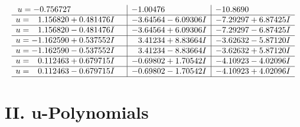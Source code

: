 \documentclass[1p]{elsarticle_modified}
\theoremstyle{definition}
\begin{document}
$$\begin{array}{c|c|c}
\begin{aligned}
u &= -0.756727\phantom{ +0.000000I}\end{aligned}
 & -1.00476\phantom{ +0.000000I} & -10.8690\phantom{ +0.000000I} \\ \hline\begin{aligned}
u &= \phantom{-}1.156820 + 0.481476 I\end{aligned}
 & -3.64564 - 6.09306 I & -7.29297 + 6.87425 I \\ \hline\begin{aligned}
u &= \phantom{-}1.156820 - 0.481476 I\end{aligned}
 & -3.64564 + 6.09306 I & -7.29297 - 6.87425 I \\ \hline\begin{aligned}
u &= -1.162590 + 0.537552 I\end{aligned}
 & \phantom{-}3.41234 + 8.83664 I & -3.62632 - 5.87120 I \\ \hline\begin{aligned}
u &= -1.162590 - 0.537552 I\end{aligned}
 & \phantom{-}3.41234 - 8.83664 I & -3.62632 + 5.87120 I \\ \hline\begin{aligned}
u &= \phantom{-}0.112463 + 0.679715 I\end{aligned}
 & -0.69802 + 1.70542 I & -4.10923 - 4.02096 I \\ \hline\begin{aligned}
u &= \phantom{-}0.112463 - 0.679715 I\end{aligned}
 & -0.69802 - 1.70542 I & -4.10923 + 4.02096 I\\
 \hline 
 \end{array}$$\newpage
\newpage\renewcommand{\arraystretch}{1}
\centering \section*{ II. u-Polynomials}
\end{document}
